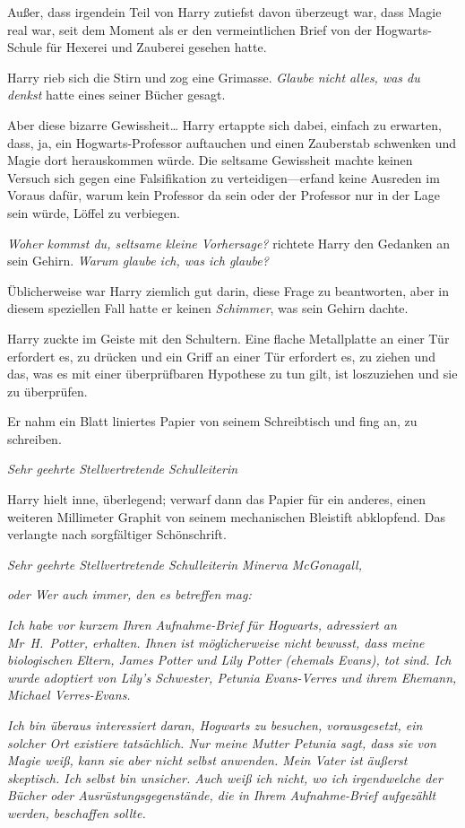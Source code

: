 {Außer, dass irgendein Teil von Harry zutiefst davon überzeugt war, dass Magie real war, seit dem Moment als er den vermeintlichen Brief von der Hogwarts-Schule für Hexerei und Zauberei gesehen hatte.

Harry rieb sich die Stirn und zog eine Grimasse. \emph{Glaube nicht alles, was du denkst} hatte eines seiner Bücher gesagt.

Aber diese bizarre Gewissheit… Harry ertappte sich dabei, einfach zu erwarten, dass, ja, ein Hogwarts-Professor auftauchen und einen Zauberstab schwenken und Magie dort herauskommen würde. Die seltsame Gewissheit machte keinen Versuch sich gegen eine Falsifikation zu verteidigen—erfand keine Ausreden im Voraus dafür, warum kein Professor da sein oder der Professor nur in der Lage sein würde, Löffel zu verbiegen.

\emph{Woher kommst du, seltsame kleine Vorhersage?} richtete Harry den Gedanken an sein Gehirn. \emph{Warum glaube ich, was ich glaube?}

Üblicherweise war Harry ziemlich gut darin, diese Frage zu beantworten, aber in diesem speziellen Fall hatte er keinen \emph{Schimmer}, was sein Gehirn dachte.

Harry zuckte im Geiste mit den Schultern. Eine flache Metallplatte an einer Tür erfordert es, zu drücken und ein Griff an einer Tür erfordert es, zu ziehen und das, was es mit einer überprüfbaren Hypothese zu tun gilt, ist loszuziehen und sie zu überprüfen.

Er nahm ein Blatt liniertes Papier von seinem Schreibtisch und fing an, zu schreiben.

\emph{Sehr geehrte Stellvertretende Schulleiterin}

Harry hielt inne, überlegend; verwarf dann das Papier für ein anderes, einen weiteren Millimeter Graphit von seinem mechanischen Bleistift abklopfend. Das verlangte nach sorgfältiger Schönschrift.

\emph{Sehr geehrte Stellvertretende Schulleiterin Minerva McGonagall,}

\emph{oder Wer auch immer, den es betreffen mag:}

\emph{Ich habe vor kurzem Ihren Aufnahme-Brief für Hogwarts, adressiert an} \emph{Mr~H.~Potter, erhalten. Ihnen ist möglicherweise nicht bewusst, dass meine biologischen Eltern, James Potter und Lily Potter (ehemals Evans), tot sind. Ich wurde adoptiert von Lily's Schwester, Petunia Evans-Verres und ihrem Ehemann, Michael Verres-Evans.}

\emph{Ich bin überaus interessiert daran, Hogwarts zu besuchen, vorausgesetzt, ein solcher Ort existiere tatsächlich. Nur meine Mutter Petunia sagt, dass sie von Magie weiß, kann sie aber nicht selbst anwenden. Mein Vater ist äußerst skeptisch. Ich selbst bin unsicher. Auch weiß ich nicht, wo ich irgendwelche der Bücher oder Ausrüstungsgegenstände, die in Ihrem Aufnahme-Brief aufgezählt werden, beschaffen sollte.}

}
